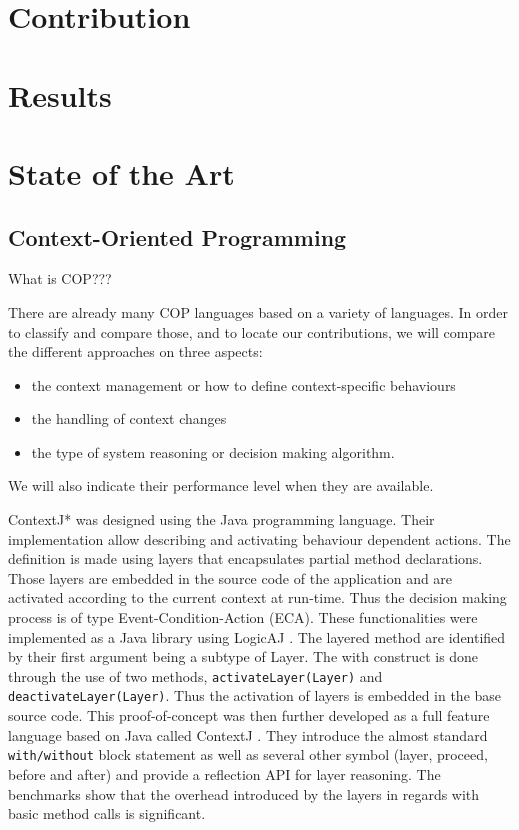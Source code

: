 \documentclass[a4paper]{article}
\begin{document}
\section{Contribution}

\section{Results}

\section{State of the Art}

\subsection{Context-Oriented Programming}

What is COP???

There are already many COP languages based on a variety of languages. In order to classify and compare those, and to locate our contributions, we will compare the different approaches on three aspects:
\begin{itemize}
  \item the context management or how to define context-specific behaviours
  \item the handling of context changes
  \item the type of system reasoning or decision making algorithm.
\end{itemize}

We will also indicate their performance level when they are available.

ContextJ* \cite{appeltauer_dedicated_2008} was designed using the Java programming language. Their implementation allow describing and activating behaviour dependent actions. The definition is made using layers that encapsulates partial method declarations. Those layers are embedded in the source code of the application and are activated according to the current context at run-time. Thus the decision making process is of type Event-Condition-Action (ECA). These functionalities were implemented as a Java library using LogicAJ \cite{}. The layered method are identified by their first argument being a subtype of Layer. The  with construct is done through the use of two methods, \lstinline|activateLayer(Layer)| and \lstinline|deactivateLayer(Layer)|. Thus the activation of layers is embedded in the base source code. This proof-of-concept was then further developed as a full feature language based on Java called ContextJ \cite{haupt_contextj:_2011} \cite{appeltauer_improving_2009}. They introduce  the almost standard \lstinline|with/without| block statement as well as several other symbol (layer, proceed, before and after) and provide a reflection API for layer reasoning. The benchmarks show that the overhead introduced by the layers in regards with basic method calls is significant.
\end{document}
